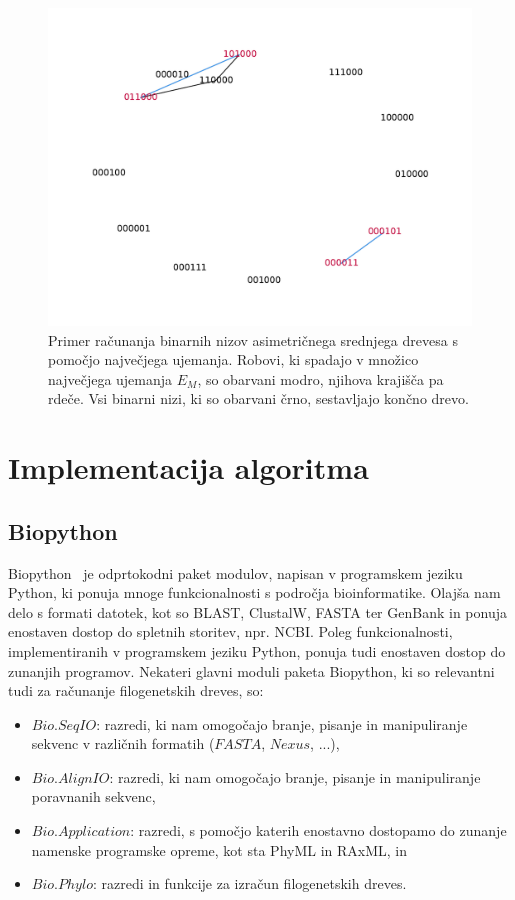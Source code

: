 \documentclass[a4paper, 12pt]{book}
\begin{document}
\begin{figure}
	\begin{center}
		\includegraphics[scale=0.65, clip=true, trim=2cm 1cm 1cm 2cm]{gfx/maxmatch_graph.pdf}
	\end{center}
	\caption{
		Primer računanja binarnih nizov asimetričnega srednjega drevesa s pomočjo 
		največjega ujemanja. Robovi, ki spadajo v množico največjega ujemanja 
		$E_{M}$, so obarvani modro, njihova krajišča pa rdeče. Vsi binarni nizi, 
		ki so obarvani črno, sestavljajo končno drevo.
	}
	\label{img-maxmatch}
\end{figure}

\chapter{Implementacija algoritma}

\section{Biopython}
Biopython~\cite{biopython} je odprtokodni paket modulov, napisan v programskem 
jeziku Python, ki ponuja mnoge funkcionalnosti s področja bioinformatike. 
Olajša nam delo s formati datotek, kot so BLAST, ClustalW, FASTA ter GenBank
in ponuja enostaven dostop do spletnih storitev, npr. NCBI. 
Poleg funkcionalnosti, implementiranih v programskem jeziku Python, ponuja
tudi enostaven dostop do zunanjih programov. Nekateri glavni moduli paketa 
Biopython, ki so relevantni tudi za računanje filogenetskih dreves, so: 

\begin{itemize}
	\item $Bio.SeqIO$: razredi, ki nam omogočajo branje, pisanje in 
	      manipuliranje sekvenc v različnih formatih ($FASTA$, $Nexus$, ...),
	\item $Bio.AlignIO$: razredi, ki nam omogočajo branje, pisanje in
	      manipuliranje poravnanih sekvenc,
	\item $Bio.Application$: razredi, s pomočjo katerih enostavno dostopamo
	      do zunanje namenske programske opreme, kot sta PhyML in RAxML, in
	\item $Bio.Phylo$: razredi in funkcije za izračun filogenetskih dreves.
\end{itemize} 
\end{document}
